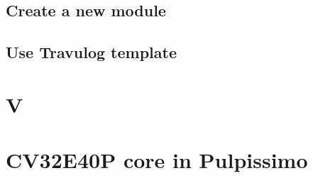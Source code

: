 {{{        }%
        \subsection{Create a new module}{
            \label{CreateNewModule}
        
        }%
        \subsection{Use Travulog template}{
            \label{AddModuleLayer}
        
        }%
	}%
	
	\section{V}{
		
	}%

	\section{CV32E40P core in Pulpissimo}{
		
	}%

}
